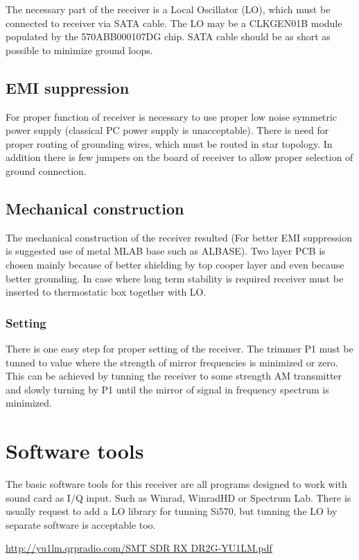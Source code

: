 \documentclass[12pt,a4paper,oneside]{article}
\begin{document}


The necessary part of the receiver is a Local Oscillator (LO), which must be connected to receiver via SATA cable. The LO may be a CLKGEN01B module populated by the 570ABB000107DG chip. SATA cable should be as short as possible to minimize ground loops.





\subsection{EMI suppression}
For proper function of receiver is necessary to use proper low noise symmetric power supply (classical PC power supply is unacceptable). There is need for proper routing of grounding wires, which must be routed in star topology. In addition there is few jumpers on the board of receiver to allow proper selection of ground connection.

\subsection{Mechanical construction}

The mechanical construction of the receiver resulted (For better EMI suppression is suggested use of metal MLAB base such as ALBASE). Two layer PCB is chosen mainly because of better shielding by top cooper layer and even because better grounding. In case where long term stability is required receiver must be inserted to thermostatic box together with LO. 

\subsubsection{Setting}
There is one easy step for proper setting of the receiver. The trimmer P1 must be tunned to value where the strength of mirror frequencies is minimized or zero. This can be achieved by tunning the receiver to some strength AM transmitter and slowly turning by P1 until the mirror of signal in frequency spectrum is minimized. 

\section{Software tools}

The basic software tools for this receiver are all programs designed to work with sound card as I/Q input. Such as Winrad, WinradHD or Spectrum Lab. There is usually request to add a LO library for tunning Si570, but tunning the LO by separate software is acceptable too.

\begin{thebibliography}{99}
\href{http://yu1lm.qrpradio.com/SMT SDR RX DR2G-YU1LM.pdf}{http://yu1lm.qrpradio.com/SMT SDR RX DR2G-YU1LM.pdf}

\end{thebibliography}
\end{document}
